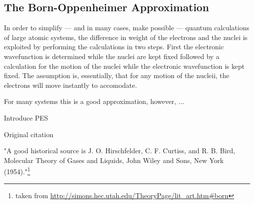 \subsection{The Born-Oppenheimer Approximation}
\label{sec:born-oppenheimer}

In order to simplify --- and in many cases, make possible --- quantum calculations of large atomic systems, the difference in weight of the electrons and the nuclei is exploited by performing the calculations in two steps.
First the electronic wavefunction is determined while the nuclei are kept fixed followed by a calculation for the motion of the nuclei while the electronic wavefunction is kept fixed.
The assumption is, essentially, that for any motion of the nucleii, the electrons will move instantly to accomodate.

For many systems this is a good approximation, however, ...

\bit
\item Introduce PES
\item Original citation~\cite{born-oppenheimer-1927}
\item "A good historical source is J. O. Hirschfelder, C. F. Curtiss, and R. B. Bird, Molecular Theory of Gases and Liquids, John Wiley and Sons, New York (1954)."\footnote{taken from \url{http://simons.hec.utah.edu/TheoryPage/lit_art.htm\#born}}
\eit

\incomplete
